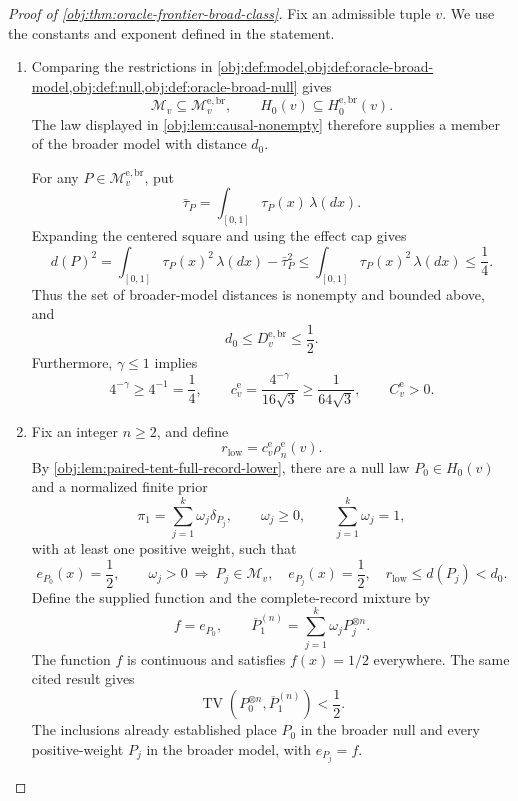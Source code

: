 \begin{proof}[Proof of \cref{obj:thm:oracle-frontier-broad-class}]
Fix an admissible tuple \(v\). We use the constants and exponent defined in the statement.

\begin{enumerate}
\item Comparing the restrictions in
\cref{obj:def:model,obj:def:oracle-broad-model,obj:def:null,obj:def:oracle-broad-null}
gives
\[
\mathcal M_v\subseteq\mathcal M_v^{\mathrm{e,br}},
\qquad
H_0(v)\subseteq H_0^{\mathrm{e,br}}(v).
\]
The law displayed in \cref{obj:lem:causal-nonempty} therefore supplies a member of the broader model with distance \(d_0\).

For any \(P\in\mathcal M_v^{\mathrm{e,br}}\), put
\[
\bar\tau_P=\int_{[0,1]}\tau_P(x)\,\lambda(dx).
\]
Expanding the centered square and using the effect cap gives
\[
d(P)^2
=\int_{[0,1]}\tau_P(x)^2\,\lambda(dx)-\bar\tau_P^2
\le\int_{[0,1]}\tau_P(x)^2\,\lambda(dx)
\le\frac14.
\]
Thus the set of broader-model distances is nonempty and bounded above, and
\[
d_0\le D_v^{\mathrm{e,br}}\le\frac12.
\]
Furthermore, \(\gamma\le1\) implies
\[
4^{-\gamma}\ge4^{-1}=\frac14,
\qquad
c_v^{\mathrm e}
=\frac{4^{-\gamma}}{16\sqrt3}
\ge\frac1{64\sqrt3},
\qquad
C_v^{\mathrm e}>0.
\]

\item Fix an integer \(n\ge2\), and define
\[
r_{\mathrm{low}}=c_v^{\mathrm e}\rho_n^{\mathrm e}(v).
\]
By \cref{obj:lem:paired-tent-full-record-lower}, there are a null law \(P_0\in H_0(v)\) and a normalized finite prior
\[
\pi_1=\sum_{j=1}^k\omega_j\delta_{P_j},
\qquad
\omega_j\ge0,
\qquad
\sum_{j=1}^k\omega_j=1,
\]
with at least one positive weight, such that
\[
e_{P_0}(x)=\frac12,
\qquad
\omega_j>0
\ \Longrightarrow\
P_j\in\mathcal M_v,\quad
e_{P_j}(x)=\frac12,\quad
r_{\mathrm{low}}\le d(P_j)<d_0.
\]
Define the supplied function and the complete-record mixture by
\[
f=e_{P_0},
\qquad
\overline P_1^{(n)}
=\sum_{j=1}^k\omega_jP_j^{\otimes n}.
\]
The function \(f\) is continuous and satisfies \(f(x)=1/2\) everywhere. The same cited result gives
\[
\operatorname{TV}\!\left(P_0^{\otimes n},\overline P_1^{(n)}\right)<\frac12.
\]
The inclusions already established place \(P_0\) in the broader null and every positive-weight \(P_j\) in the broader model, with \(e_{P_j}=f\).


\end{enumerate}
\end{proof}
